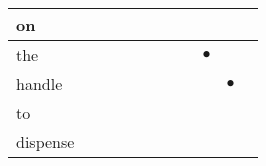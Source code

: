 \documentclass[landscape]{article}
\newcommand{\ssp}{\hspace{2pt}}
\newcommand{\mex}{\cellcolor{g}$\bullet$}
\begin{document}
\begin{tabular}{|l|p{10pt}|p{10pt}|p{10pt}|p{10pt}|p{10pt}|p{10pt}|p{10pt}|p{10pt}|p{10pt}|p{10pt}|}
\hline
\ssp on \ssp&\hspace{2pt}&\hspace{2pt}&\hspace{2pt}&\hspace{2pt}&\hspace{2pt}&\hspace{2pt}&\hspace{2pt}&\hspace{2pt}&\hspace{2pt}&\hspace{2pt}\\
\hline
\ssp \cellcolor{ref7}the \ssp&\hspace{2pt}&\hspace{2pt}&\hspace{2pt}&\hspace{2pt}&\hspace{2pt}&\hspace{2pt}&\hspace{2pt}&\hspace{2pt}\mex&\hspace{2pt}&\hspace{2pt}\\
\hline
\ssp \cellcolor{ref8}handle \ssp&\hspace{2pt}&\hspace{2pt}&\hspace{2pt}&\hspace{2pt}&\hspace{2pt}&\hspace{2pt}&\hspace{2pt}&\hspace{2pt}&\hspace{2pt}\mex&\hspace{2pt}\\
\hline
\ssp to \ssp&\hspace{2pt}&\hspace{2pt}&\hspace{2pt}&\hspace{2pt}&\hspace{2pt}&\hspace{2pt}&\hspace{2pt}&\hspace{2pt}&\hspace{2pt}&\hspace{2pt}\\
\hline
\ssp dispense \ssp&\hspace{2pt}&\hspace{2pt}&\hspace{2pt}&\hspace{2pt}&\hspace{2pt}&\hspace{2pt}&\hspace{2pt}&\hspace{2pt}&\hspace{2pt}&\hspace{2pt}\\

\end{tabular}
\end{document}
